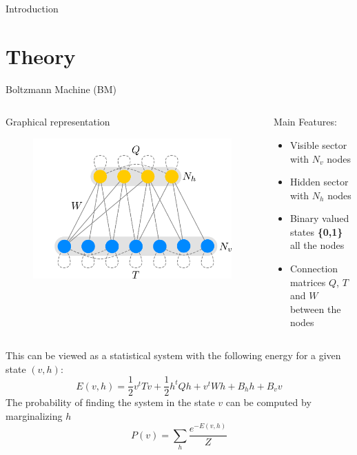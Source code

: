 \documentclass[10pt]{beamer}
\begin{document}
\begin{frame}{Introduction}
\begin{figure}
\begin{center}
        \end{center}
    \end{figure}
\end{frame}
\section{Theory}

\begin{frame}{{Boltzmann Machine (BM)}}
    \begin{columns}
        \begin{column}[]{0.5 \textwidth}

            Graphical representation
            \begin{figure}
                \includegraphics[width=\textwidth]{figures/rtbm.pdf}
            \end{figure}
        \end{column}
        \begin{column}[]{0.5 \textwidth}
            Main Features:
            \begin{itemize} 
                \item Visible sector with $N_v$ nodes
                \item Hidden sector with $N_h$ nodes
                \item Binary valued states \textbf{\{0,1\}} all the nodes
                \item Connection matrices $Q$, $T$ and $W$ between the nodes
            \end{itemize}
        \end{column}
    \end{columns}
    This can be viewed as a statistical system with the following energy for a given state $(v, h)$:
    \begin{equation*}
        E(v, h) = \frac{1}{2} v^t T v + \frac{1}{2} h^t Q h + v^t W h + B_h h + B_v v
    \end{equation*}
    The probability of finding the system in the state $v$ can be computed by marginalizing $h$
\begin{equation*}
    P(v) = \sum_h \frac{e^{- E(v,h)}}{Z}
\end{equation*}  
    
    
\end{frame}
\end{document}
